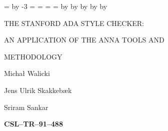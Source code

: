 


\def\apekeywordfont{\footnotesize\bf}
\def\apecommentfont{\footnotesize\it}
\def\apebodyfont{\small\rm}
\def\apelmargin{0.5cm}

\setlength{\textwidth}{6.8in}
\setlength{\textheight}{8.7in}
\setlength{\topmargin}{-1in}
\setlength{\headheight}{0in}
\setlength{\headsep}{1in}
\setlength{\columnsep}{.3in}
\setlength{\oddsidemargin}{-0.15in}
\setlength{\parindent}{0pt}
\setlength{\parskip}{\medskipamount}



\newdimen\indz
\newdimen\inda
\newdimen\indb
\newdimen\indc
\newdimen\indd
\newdimen\inde
\indz=5in
\inda=\apehspace
\multiply\inda by -3
\indb=\inda
\indc=\inda
\indd=\inda
\inde=\inda
\advance\inda by \indz
\advance\indb by \inda
\advance\indc by \indb
\advance\indd by \indc
\advance\inde by \indd

\setcounter{page}{0}

\newdimen\coverindent
\coverindent=0.8cm

\def\tfb{\Large\bf}
\def\tf{\Large}

\vspace*{2.5cm}

{\tfb
\hspace*{\coverindent}\strut THE STANFORD ADA STYLE CHECKER:\\
\hspace*{\coverindent}\strut AN APPLICATION OF THE ANNA TOOLS AND\\
\hspace*{\coverindent}\strut METHODOLOGY}

\vspace{2.8cm}

{\tfb
\hspace*{\coverindent}\strut Micha{\l} Walicki\\
\hspace*{\coverindent}\strut Jens Ulrik Skakkeb{\ae}k\\
\hspace*{\coverindent}\strut Sriram Sankar}

\vspace{2.8cm}

\hspace*{\coverindent}{\tf Technical Report:} {\tfb CSL--TR--91--488}

\hspace*{\coverindent}{\tf (Program Analysis and Verification Group
                            Report No. 55)}

